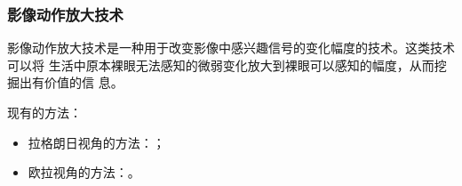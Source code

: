 \documentclass[xcolor=svgnames,serif,table,10pt]{beamer}
\begin{document}
\begin{frame}[t]
\begin{center}
{}
  \end{center}
\end{frame}

\begin{frame}
  \frametitle{影像动作放大技术}
  影像动作放大技术是一种用于改变影像中感兴趣信号的变化幅度的技术。这类技术可以将
  生活中原本裸眼无法感知的微弱变化放大到裸眼可以感知的幅度，从而挖掘出有价值的信
  息。

  \medskip

  现有的方法：
  \begin{itemize}
  \item 拉格朗日视角的方法：\cite{liu2005motion}；
  \item 欧拉视角的方法：\cite{wu2012eulerian, Wadhwa2013PhaseBased}。
  \end{itemize}
\end{frame}
\end{document}
